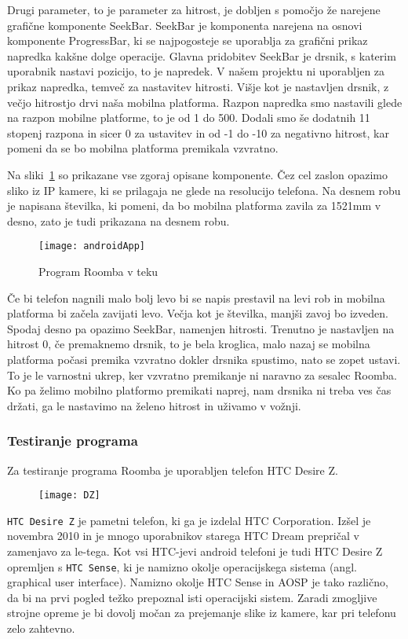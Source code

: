 \documentclass[a4paper, 12pt]{book}
\begin{document}
Drugi parameter, to je parameter za hitrost, je dobljen s pomočjo že narejene grafične komponente SeekBar. SeekBar je komponenta narejena na osnovi komponente ProgressBar, ki se najpogosteje se uporablja za grafični prikaz napredka kakšne dolge operacije. Glavna pridobitev SeekBar je drsnik, s katerim uporabnik nastavi pozicijo, to je napredek. V našem projektu ni uporabljen za prikaz napredka, temveč za nastavitev hitrosti. Višje kot je nastavljen drsnik, z večjo hitrostjo drvi naša mobilna platforma. Razpon napredka smo nastavili glede na razpon mobilne platforme, to je od 1 do 500. Dodali smo še dodatnih 11 stopenj razpona in sicer 0 za ustavitev in od -1 do -10 za negativno hitrost, kar pomeni da se bo mobilna platforma premikala vzvratno. 

Na sliki~\ref{picAndroidApp} so prikazane vse zgoraj opisane komponente. Čez cel zaslon opazimo sliko iz IP kamere, ki se prilagaja ne glede na resolucijo telefona. Na desnem robu je napisana številka, ki pomeni, da bo mobilna platforma zavila za 1521mm v desno, zato je tudi prikazana na desnem robu. 

\begin{figure}[h]
	\centering
	\texttt{[image: androidApp]}
	\caption{Program Roomba v teku}
	\label{picAndroidApp}
\end{figure}

Če bi telefon nagnili malo bolj levo bi se napis prestavil na levi rob in mobilna platforma bi začela zavijati levo. Večja kot je številka, manjši zavoj bo izveden. Spodaj desno pa opazimo SeekBar, namenjen hitrosti. Trenutno je nastavljen na hitrost 0, če premaknemo drsnik, to je bela kroglica, malo nazaj se mobilna platforma počasi premika vzvratno dokler drsnika spustimo, nato se zopet ustavi. To je le varnostni ukrep, ker vzvratno premikanje ni naravno za sesalec Roomba. Ko pa želimo mobilno platformo premikati naprej, nam drsnika ni treba ves čas držati, ga le nastavimo na želeno hitrost in uživamo v vožnji.

\subsubsection{Testiranje programa}
Za testiranje programa Roomba je uporabljen telefon HTC Desire Z.

\begin{figure}[h]
	\centering
	\texttt{[image: DZ]}
	\label{picDZ}
\end{figure}

{\tt HTC Desire Z} je pametni telefon, ki ga je izdelal HTC Corporation. Izšel je novembra 2010 in je mnogo uporabnikov starega HTC Dream prepričal v zamenjavo za le-tega. Kot vsi HTC-jevi android telefoni je tudi HTC Desire Z opremljen s {\tt HTC Sense}, ki je namizno okolje operacijskega sistema (angl. graphical user interface). Namizno okolje HTC Sense in AOSP je tako različno, da bi na prvi pogled težko prepoznal isti operacijski sistem. Zaradi zmogljive strojne opreme je bi dovolj močan za prejemanje slike iz kamere, kar pri telefonu zelo zahtevno.
\end{document}
